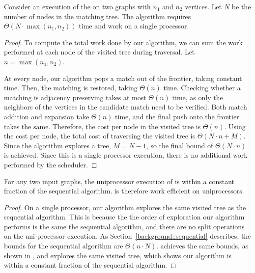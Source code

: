 \begin{theorem}\label{thm:uni-work}
Consider an execution of the \ouralgorithm{} on two graphs with $n_1$
and $n_2$ vertices.
%
Let $N$ be the number of nodes in the matching tree.
%
The algorithm requires   $\Theta(N \cdot \max(n_1, n_2))$ time and work 
on  a single processor.
\end{theorem}

\begin{proof}
  To compute the total work done by our algorithm, we can sum
  the work performed at each node of the visited tree during
  traversal. Let $n = \max(n_1, n_2)$.

  At every node, our algorithm pops a match
  out of the frontier, taking constant time.
  Then, the matching is restored, taking $\Theta(n)$ time.
  Checking whether a matching is adjacency preserving takes at most
  $\Theta(n)$ time, as only the neighbors of the vertices
  in the candidate match need to be verified.
  Both match addition and expansion take $\Theta(n)$ time,
  and the final push onto the frontier takes the same.
  Therefore, the cost per node in the visited tree is $\Theta(n)$.
  Using the cost per node, the total cost of traversing the
  visited tree is $\Theta(N \cdot n + M)$.
  Since the algorithm explores a tree, $M = N - 1$, so
  the final bound of $\Theta(N \cdot n)$ is achieved.
  Since this is a single processor execution,
  there is no additional work performed by the scheduler.
\end{proof}

\begin{corollary} 
For any two input graphs, the uniprocessor execution of
\ouralgorithm{} is within a constant fraction of the sequential
algorithm.
%
\ouralgorithm{} is therefore work efficient on uniprocessors.
\end{corollary}

\begin{proof}

On a single processor, our algorithm explores the same visited tree
as the sequential algorithm.
%
This is because the the order of exploration our algorithm performs
is the same the sequential algorithm, and there are no split operations
on the uni-processor execution.
%
As Section~\ref{background::sequential} describes, the bounds for the sequential
algorithm are $\Theta(n \cdot N)$.
%
\Ouralgorithm{} achieves the same bounds, as shown in ,
and explores the same visited tree, which shows our algorithm is within
a constant fraction of the sequential algorithm.
\end{proof}


